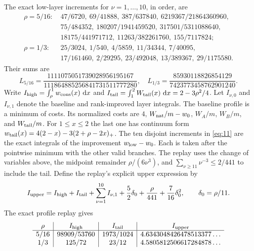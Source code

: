 The exact low-layer increments for $\nu=1,\ldots,10$, in order, are
\begin{equation}
\begin{aligned}
\rho=5/16:\ &47/6720,\ 69/41888,\ 387/637840,\ 6219367/21864360960,\\
&75/484352,\ 180207/1941459520,\ 317501/5311088640,\\
&18175/441971712,\ 11263/382261760,\ 155/7117824;\\[2pt]
\rho=1/3:\ &25/3024,\ 1/540,\ 4/5859,\ 11/34344,\ 7/40095,\\
&17/161460,\ 2/29295,\ 23/492048,\ 13/389367,\ 29/1175580.
\end{aligned}                                                    \label{eq:11}
\end{equation}
Their sums are
\begin{equation}
 L_{5/16}=\frac{1111075051739028956195167}
 {111864885256841731511777280},\quad
 L_{1/3}=\frac{85930118826854129}{7423773458762901240}.    \label{eq:12}
\end{equation}
Write $I_{\rm high}=\int_\rho^1w_{\rm cons}(x)\,\,\mathrm d x$ and
$I_{\rm tail}=\int_1^2W_{\rm tail}(x)\,\,\mathrm d x=2-3\rho^2/4$. Let
$I_{\nu,0}$ and $I_{\nu,1}$ denote the baseline and rank-improved layer
integrals. The baseline profile is a minimum of costs. Its normalized costs
are $4$, $W_{\rm nat}/m-w_0$, $W_A/m$, $W_B/m$, and $W_{\rm tail}/m$.
For $1\le x\le2$ the last one has continuum form
$w_{\rm tail}(x)=4(2-x)-3(2+\rho-2x)_+$.
The ten disjoint increments in \eqref{eq:11} are the exact integrals of
the improvement $w_{\rm low}-w_0$. Each is taken after the pointwise minimum
with the other valid branches. The replay uses the change of variables above,
the midpoint remainder $\rho/(6\nu^3)$, and
$\sum_{\nu\ge11}\nu^{-3}\le2/441$ to include the tail.
Define the replay's explicit upper expression by
\begin{equation}
 I_{\rm upper}=I_{\rm high}+I_{\rm tail}
   +\sum_{\nu=1}^{10}I_{\nu,1}
   +\frac52\delta_0+\frac{\rho}{441}+\frac7{16}\delta_0^2,
 \qquad \delta_0=\rho/11.                                 \label{eq:I-upper}
\end{equation}
The exact profile replay gives
\[
\begin{array}{c|c|c|c}
\rho&I_{\rm high}&I_{\rm tail}&I_{\rm upper}\\ \hline
5/16&98909/53760&1973/1024&4.6343048426478513377\ldots\\
1/3&125/72&23/12&4.5805812506617284878\ldots
\end{array}
\]

